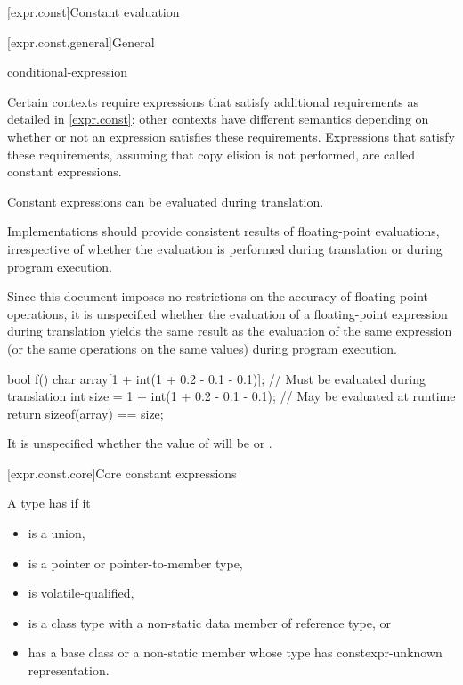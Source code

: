 [expr.const]{Constant evaluation}%

[expr.const.general]{General}

\begin{bnf}
\br
    conditional-expression
\end{bnf}

\pnum
Certain contexts require expressions that satisfy additional
requirements as detailed in \ref{expr.const}; other contexts have different
semantics depending on whether or not an expression satisfies these requirements.
Expressions that satisfy these requirements,
assuming that copy elision is not performed,
are called constant expressions.
\begin{note}
Constant expressions can be evaluated
during translation.
\end{note}

\pnum
\recommended
Implementations should provide consistent results of floating-point evaluations,
irrespective of whether the evaluation is performed
during translation or during program execution.
\begin{note}
Since this document
imposes no restrictions on the accuracy of floating-point operations, it is unspecified whether the
evaluation of a floating-point expression during translation yields the same result as the
evaluation of the same expression (or the same operations on the same values) during program
execution.
\begin{example}
\begin{codeblock}
bool f() {
    char array[1 + int(1 + 0.2 - 0.1 - 0.1)];   // Must be evaluated during translation
    int size = 1 + int(1 + 0.2 - 0.1 - 0.1);    // May be evaluated at runtime
    return sizeof(array) == size;
}
\end{codeblock}
It is unspecified whether the value of  will be  or .
\end{example}
\end{note}

[expr.const.core]{Core constant expressions}

\pnum
{}%
A type has  if it
\begin{itemize}
\item is a union,
\item is a pointer or pointer-to-member type,
\item is volatile-qualified,
\item is a class type with a non-static data member of reference type, or
\item
has a base class or a non-static member whose
type has constexpr-unknown representation.
\end{itemize}

